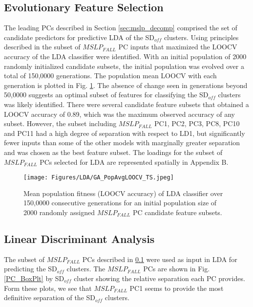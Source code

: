 \documentclass{tATO2e}
\newcommand{\sdoff}{SD$_{off}$}
\begin{document}
\subsection{Evolutionary Feature Selection}\label{ga_feat_selec}
The leading PCs described in Section \ref{sec:mslp_decomp} comprised the set of candidate predictors for predictive LDA of the \sdoff{} clusters. Using principles described in \cite{Mitchell1998} the subset of $MSLP_{FALL}$ PC inputs that maximized the LOOCV accuracy of the LDA classifier were identified. With an initial population of 2000 randomly initialized candidate subsets, the initial population was evolved over a total of 150,0000 generations. The population mean LOOCV with each generation is plotted in Fig. \ref{fig:GA_pop_fit}. The absence of change seen in generations beyond 50,0000 suggests an optimal subset of features for classifying the \sdoff{} clusters was likely identified. There were several candidate feature subsets that obtained a LOOCV accuracy of 0.89, which was the maximum observed accuracy of any subset. However, the subset including $MSLP_{FALL}$ PC1, PC2, PC3, PC8, PC10 and PC11 had a high degree of separation with respect to LD1, but significantly fewer inputs than some of the other models with marginally greater separation and was chosen as the best feature subset. The loadings for the subset of $MSLP_{FALL}$ PCs selected for LDA are represented spatially in Appendix B.  


\begin{figure}
	\begin{center}
		\texttt{[image: Figures/LDA/GA\_PopAvgLOOCV\_TS.jpeg]}
		\caption{Mean population fitness (LOOCV accuracy) of LDA classifier over 150,0000 consecutive generations for an initial population size of 2000 randomly assigned $MSLP_{FALL}$ PC candidate feature subsets.}
		\label{fig:GA_pop_fit}
	\end{center}
\end{figure}


\subsection{Linear Discriminant Analysis}
The subset of $MSLP_{FALL}$ PCs described in \ref{ga_feat_selec} were used as input in LDA for predicting the \sdoff{} clusters. The $MSLP_{FALL}$ PCs are shown in Fig. \ref{PC_BoxPlt} by \sdoff{} cluster showing the relative separation each PC provides. Form these plots, we see that $MSLP_{FALL}$ PC1 seems to provide the most definitive separation of the \sdoff{} clusters. 
\end{document}

